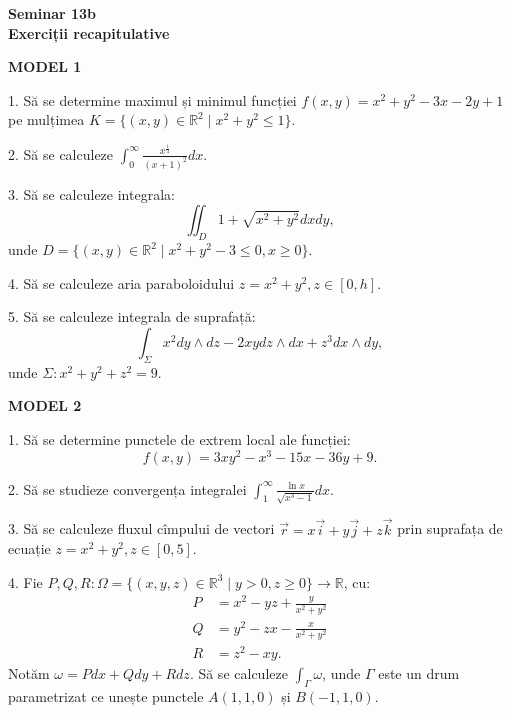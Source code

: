 \documentclass[11pt,a4paper]{article}
\newcommand\ds{\displaystyle}
\newcommand\RR{\mathbb{R}}
\theoremstyle{dotless}
\theoremstyle{dotlessdr}
\begin{document}
\begin{center}
  {\large\textbf{Seminar 13b \\ Exerciții recapitulative}}
\end{center}

\vspace{1cm}

\textbf{MODEL 1}

1. Să se determine maximul și minimul funcției $f(x, y) = x^2 + y^2 - 3x - 2y + 1$
pe mulțimea $K = \{(x, y) \in \RR^2 \mid x^2 + y^2 \leq 1 \}$.

\vspace{1cm}

2. Să se calculeze $\ds\int_0^\infty \frac{x^{\frac{1}{4}}}{(x + 1)^2} dx$.

\vspace{1cm}

3. Să se calculeze integrala:
\[
  \iint_D 1 + \sqrt{x^2 + y^2} dx dy,
\]
unde $D = \{(x, y) \in \RR^2 \mid x^2 + y^2 - 3 \leq 0, x \geq 0 \}$.

\vspace{1cm}

4. Să se calculeze aria paraboloidului $z = x^2 + y^2, z \in [0, h]$.

\vspace{1cm}

5. Să se calculeze integrala de suprafață:
\[
  \int_\Sigma x^2 dy \wedge dz - 2xy dz \wedge dx + z^3 dx \wedge dy,
\]
unde $\Sigma : x^2 + y^2 + z^2 = 9$.

\vspace{2cm}

\textbf{MODEL 2}

1. Să se determine punctele de extrem local ale funcției:
\[
  f(x, y) = 3xy^2 - x^3 - 15x - 36y + 9.
\]

\vspace{1cm}

2. Să se studieze convergența integralei
$\ds\int_1^\infty \frac{\ln x}{\sqrt{x^3 - 1}} dx$.

\vspace{1cm}

3. Să se calculeze fluxul cîmpului de vectori $\vec{r} = x\vec{i} + y\vec{j} + z \vec{k}$
prin suprafața de ecuație $z = x^2 + y^2, z \in [0, 5]$.

\vspace{1cm}

4. Fie $P, Q, R : \Omega = \{(x, y, z) \in \RR^3 \mid y > 0, z \geq 0 \} \to \RR$,
cu:
\begin{align*}
  P &= x^2 - yz + \frac{y}{x^2 + y^2} \\
  Q &= y^2 - zx - \frac{x}{x^2 + y^2} \\
  R &= z^2 - xy.
\end{align*}
Notăm $\omega = Pdx + Qdy + Rdz$. Să se calculeze $\ds\int_\Gamma \omega$, unde
$\Gamma$ este un drum parametrizat ce unește punctele $A(1, 1, 0)$ și $B(-1, 1, 0)$.
\end{document}
